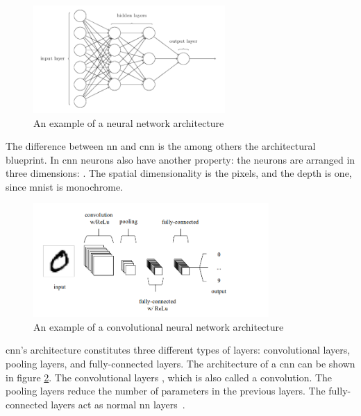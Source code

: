\begin{figure}[htb!]
    \centering
    \includegraphics[width=0.65\textwidth]{figures/michael-nielsen-nn-architecture.png}
    \caption{An example of a neural network architecture~\cite{michael-nielsen-nn}}
    \label{fig:nn-example-architecture}
\end{figure}

The difference between \gls{nn} and \gls{cnn} is the among others the architectural blueprint. In \gls{cnn} neurons also have another property: the neurons are arranged in three dimensions: . The spatial dimensionality is the pixels, and the depth is one, since \gls{mnist} is monochrome.


\begin{figure}[htb!]
    \centering
    \includegraphics[width=0.8\textwidth]{figures/cnn-simple-architecture.png}
    \caption{An example of a convolutional neural network architecture~\cite{introduction-to-cnn}}
    \label{fig:simple-cnn-architecture}
\end{figure}

\gls{cnn}'s architecture constitutes three different types of layers: convolutional layers, pooling layers, and fully-connected layers. The architecture of a \gls{cnn} can be shown in figure \ref{fig:simple-cnn-architecture}. The convolutional layers , which is also called a convolution. The pooling layers reduce the number of parameters in the previous layers. The fully-connected layers act as normal \gls{nn} layers~\cite{introduction-to-cnn}.


